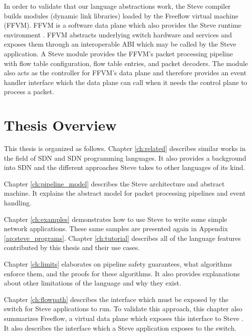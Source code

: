 
In order to validate that our language abstractions work, the Steve compiler builds modules (dynamic link libraries)
loaded by the Freeflow virtual machine (FFVM).
FFVM is a software data plane which also provides the Steve runtime environment \cite{freeflow_software}.
FFVM abstracts underlying switch
hardware and services and exposes them through an interoperable ABI which may be called by the Steve application.
A Steve module provides the FFVM's packet processing pipeline with
flow table configuration, flow table entries, and packet decoders.
The module also acts as the controller for FFVM's data plane and therefore provides an event handler interface which the data plane can call when it needs the control plane to process a packet.

\section{Thesis Overview}

This thesis is organized as follows. Chapter \ref{ch:related} describes similar
works in the field of SDN and SDN programming languages. It also provides a
background into SDN and the different approaches Steve takes to other languages
of its kind.

Chapter \ref{ch:pipeline_model} describes the Steve architecture and abstract machine. It explains the abstract model for packet processing pipelines and event handling.

Chapter \ref{ch:examples} demonstrates how to use Steve to write some simple network applications.
These same samples are presented again in Appendix
\ref{ap:steve_programs}.
Chapter \ref{ch:tutorial} describes all of the language features contributed by this thesis and their use cases.

Chapter \ref{ch:limits} elaborates on pipeline safety guarantees, what algorithms enforce them, and the proofs for these algorithms. It also provides explanations about other
limitations of the language and why they exist.

Chapter \ref{ch:flowpath} describes the interface which must be exposed by the switch for Steve applications to run. To validate this approach, this chapter also summarizes Freeflow, a virtual data plane which exposes this interface to Steve \cite{freeflow_software}. It also describes the interface which a Steve application exposes to the switch.

